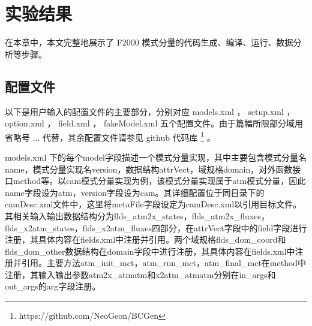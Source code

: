 
\chapter{实验结果}
\label{cha:experiment}

在本章中，本文完整地展示了 F2000 模式分量的代码生成、编译、运行、数据分析等步骤。

\section{配置文件}

以下是用户输入的配置文件的主要部分，分别对应 models.xml ， setup.xml ， option.xml ， field.xml ，  fakeModel.xml 五个配置文件。由于篇幅所限部分域用省略号 ... 代替，其余配置文件请参见 github 代码库 \footnote{https://github.com/NeoGeon/BCGen} 。

models.xml 下的每个model字段描述一个模式分量实现，其中主要包含模式分量名name，模式分量实现名version，数据结构attrVect，域规格domain，对外函数接口method等。以cam模式分量实现为例，该模式分量实现属于atm模式分量，因此name字段设为atm，version字段设为cam。其详细配置位于同目录下的camDesc.xml文件中，这里将metaFile字段设定为camDesc.xml以引用目标文件。其相关输入输出数据结构分为flds\_atm2x\_states，flds\_atm2x\_fluxes，flds\_x2atm\_states，flds\_x2atm\_fluxes四部分，在attrVect字段中的field字段进行注册，其具体内容在fields.xml中注册并引用。两个域规格flds\_dom\_coord和flds\_dom\_other数据结构在domain字段中进行注册，其具体内容在fields.xml中注册并引用。主要方法atm\_init\_mct，atm\_run\_mct，atm\_final\_mct在method中注册，其输入输出参数atm2x\_atmatm和x2atm\_atmatm分别在in\_args和out\_args的arg字段注册。

